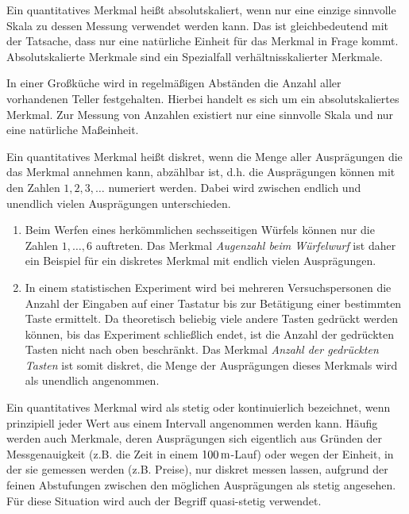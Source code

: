 \documentclass{lecture}
\begin{document}
    Ein quantitatives Merkmal heißt absolutskaliert, wenn nur eine einzige sinnvolle Skala zu dessen Messung verwendet werden kann.
    Das ist gleichbedeutend mit der Tatsache, dass nur eine natürliche Einheit für das Merkmal in Frage kommt.
    Absolutskalierte Merkmale sind ein Spezialfall verhältnisskalierter Merkmale.

    \begin{example}
        In einer Großküche wird in regelmäßigen Abständen die Anzahl aller vorhandenen Teller festgehalten.
        Hierbei handelt es sich um ein absolutskaliertes Merkmal.
        Zur Messung von Anzahlen existiert nur eine sinnvolle Skala und nur eine natürliche Maßeinheit.
    \end{example}

    Ein quantitatives Merkmal heißt diskret, wenn die Menge aller Ausprägungen die das Merkmal annehmen kann, abzählbar ist, d.h. die Ausprägungen können mit den Zahlen \(1, 2, 3, \ldots\) numeriert werden.
    Dabei wird zwischen endlich und unendlich vielen Ausprägungen unterschieden.

    \begin{example}
        \begin{enumerate}
            \item Beim Werfen eines herkömmlichen sechsseitigen Würfels können nur die Zahlen \(1, \ldots, 6\) auftreten.
            Das Merkmal \emph{Augenzahl beim Würfelwurf} ist daher ein Beispiel für ein diskretes Merkmal mit endlich vielen Ausprägungen.
            \item In einem statistischen Experiment wird bei mehreren Versuchspersonen die Anzahl der Eingaben auf einer Tastatur bis zur Betätigung einer bestimmten Taste ermittelt.
            Da theoretisch beliebig viele andere Tasten gedrückt werden können, bis das Experiment schließlich endet, ist die Anzahl der gedrückten Tasten nicht nach oben beschränkt.
            Das Merkmal \emph{Anzahl der gedrückten Tasten} ist somit diskret, die Menge der Ausprägungen dieses Merkmals wird als unendlich angenommen.
        \end{enumerate}
    \end{example}

    Ein quantitatives Merkmal wird als stetig oder kontinuierlich bezeichnet, wenn prinzipiell jeder Wert aus einem Intervall angenommen werden kann.
    Häufig werden auch Merkmale, deren Ausprägungen sich eigentlich aus Gründen der Messgenauigkeit (z.B. die Zeit in einem \(100\,\si{\meter}\)-Lauf) oder wegen der Einheit, in der sie gemessen werden (z.B. Preise), nur diskret messen lassen, aufgrund der feinen Abstufungen zwischen den möglichen Ausprägungen als stetig angesehen.
    Für diese Situation wird auch der Begriff quasi-stetig verwendet.
\end{document}
